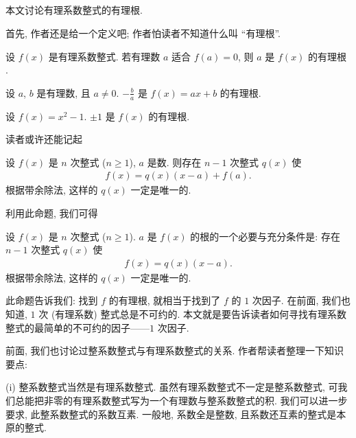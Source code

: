 \subsection*{\RationalRootsOfPolynomialsOverQ}
\markright{\RationalRootsOfPolynomialsOverQ}

本文讨论有理系数整式的有理根.

首先, 作者还是给一个定义吧; 作者怕读者不知道什么叫 ``有理根''.

\begin{definition}
    设 $f(x)$ 是有理系数整式. 若有理数 $a$ 适合 $f(a) = 0$, 则 $a$ 是 $f(x)$ 的有理根 .
\end{definition}

\begin{example}
    设 $a$, $b$ 是有理数, 且 $a \neq 0$. $-\frac{b}{a}$ 是 $f(x) = ax + b$ 的有理根.
\end{example}

\begin{example}
    设 $f(x) = x^2 - 1$. $\pm 1$ 是 $f(x)$ 的有理根.
\end{example}

读者或许还能记起
\begin{proposition}
    设 $f(x)$ 是 $n$ 次整式 ($n \geq 1$), $a$ 是数. 则存在 $n-1$ 次整式 $q(x)$ 使
    \begin{align*}
        f(x) = q(x) (x-a) + f(a).
    \end{align*}
    根据带余除法, 这样的 $q(x)$ 一定是唯一的.
\end{proposition}

利用此命题, 我们可得
\begin{proposition}
    设 $f(x)$ 是 $n$ 次整式 ($n \geq 1$). $a$ 是 $f(x)$ 的根的一个必要与充分条件是: 存在 $n-1$ 次整式 $q(x)$ 使
    \begin{align*}
        f(x) = q(x) (x-a).
    \end{align*}
    根据带余除法, 这样的 $q(x)$ 一定是唯一的.
\end{proposition}

此命题告诉我们: 找到 $f$ 的有理根, 就相当于找到了 $f$ 的 $1$ 次因子. 在前面, 我们也知道, $1$ 次 (有理系数) 整式总是不可约的. 本文就是要告诉读者如何寻找有理系数整式的最简单的不可约的因子——$1$ 次因子.

前面, 我们也讨论过整系数整式与有理系数整式的关系. 作者帮读者整理一下知识要点:

(i) 整系数整式当然是有理系数整式. 虽然有理系数整式不一定是整系数整式, 可我们总能把非零的有理系数整式写为一个有理数与整系数整式的积. 我们可以进一步要求, 此整系数整式的系数互素. 一般地, 系数全是整数, 且系数还互素的整式是本原的整式.

